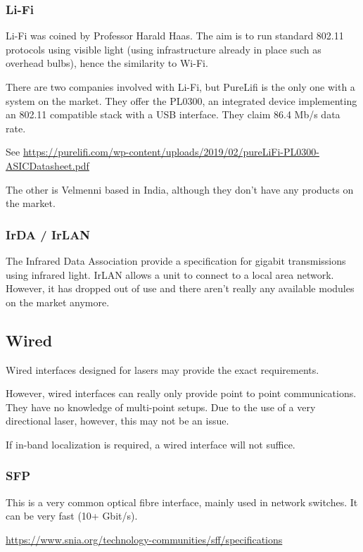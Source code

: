 \subsubsection{Li-Fi}
Li-Fi was coined by Professor Harald Haas. The aim is to run standard 802.11
protocols using visible light (using infrastructure already in place such as
overhead bulbs), hence the similarity to Wi-Fi.

There are two companies involved with Li-Fi, but PureLifi is the only one with
a system on the market. They offer the PL0300, an integrated device
implementing an 802.11 compatible stack with a USB interface. They claim
86.4 Mb/s data rate.

See \url{https://purelifi.com/wp-content/uploads/2019/02/pureLiFi-PL0300-ASICDatasheet.pdf}

The other is Velmenni based in India, although they don't have any products
on the market.

\subsubsection{IrDA / IrLAN}
The Infrared Data Association provide a specification for gigabit transmissions
using infrared light. IrLAN allows a unit to connect to a local area network.
However, it has dropped out of use and there aren't really any available
modules on the market anymore.

\subsection{Wired}
Wired interfaces designed for lasers may provide the exact requirements.

However, wired interfaces can really only provide point to point
communications. They have no knowledge of multi-point setups. Due to the use
of a very directional laser, however, this may not be an issue.

If in-band localization is required, a wired interface will not suffice.

\subsubsection{\ac{SFP}}

This is a very common optical fibre interface, mainly used in network
switches. It can be very fast (10+ Gbit/s).

\url{https://www.snia.org/technology-communities/sff/specifications}

